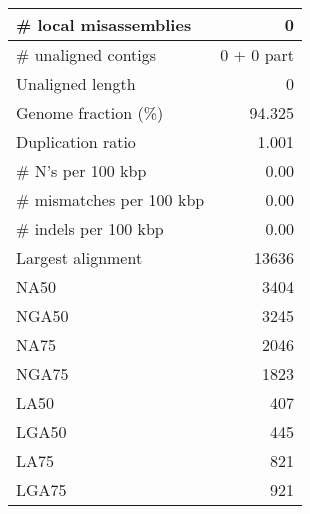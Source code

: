\documentclass[12pt,a4paper]{article}
\begin{document}
\begin{table}[ht]
\begin{center}
\begin{tabular}{|l*{1}{|r}|}
\# local misassemblies & 0 \\ \hline
\# unaligned contigs & 0 + 0 part \\ \hline
Unaligned length & 0 \\ \hline
Genome fraction (\%) & 94.325 \\ \hline
Duplication ratio & 1.001 \\ \hline
\# N's per 100 kbp & 0.00 \\ \hline
\# mismatches per 100 kbp & 0.00 \\ \hline
\# indels per 100 kbp & 0.00 \\ \hline
Largest alignment & 13636 \\ \hline
NA50 & 3404 \\ \hline
NGA50 & 3245 \\ \hline
NA75 & 2046 \\ \hline
NGA75 & 1823 \\ \hline
LA50 & 407 \\ \hline
LGA50 & 445 \\ \hline
LA75 & 821 \\ \hline
LGA75 & 921 \\ \hline
\end{tabular}
\end{center}
\end{table}
\end{document}
